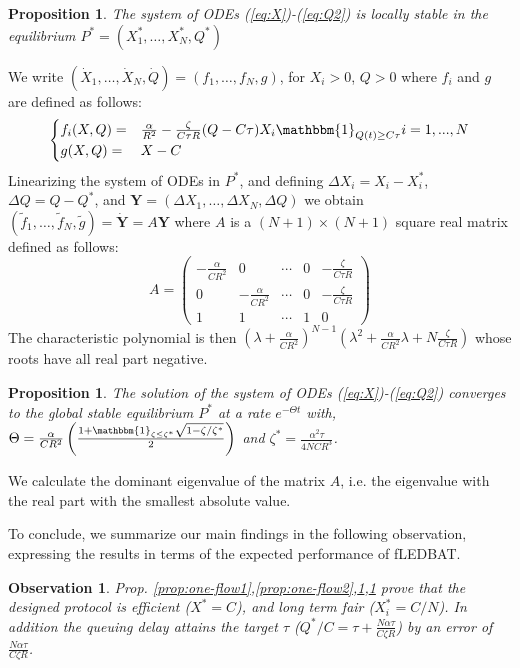 \documentclass[conference]{IEEEtran}
\newtheorem{prop}[theorem]{Proposition}
\newtheorem{obs}[theorem]{Observation}
\newcommand{\I}[1]{{\mathbbm{1}_{#1}}}
\newcommand{\fledbat}[0]{fLEDBAT}
\begin{document}
\begin{prop}\label{prop:one-flow3}
The system of ODEs (\ref{eq:X})-(\ref{eq:Q2}) is locally
stable in the equilibrium $P^*=(X_1^*,\dots, X_N^*,Q^*)$
\end{prop}
\begin{IEEEproof}
We write $(\dot{X}_1,\dots,\dot{X}_N,\dot{Q}) = (f_1,\dots,f_N,g)$, for $X_i>0$, $Q>0$ where $f_i$ and $g$
are defined as follows:
\begin{align}\label{eq:local-stable-XQ}
\begin{cases}
f_i(X,Q) =& \frac{\alpha}{R^2} - \frac{\zeta}{C\tau R}(Q-C\tau)X_i\I{Q(t)\ge C\tau} i=1,...,N\\
g(X,Q) =& X - C
\end{cases}
\end{align}
Linearizing the system of ODEs in $P^{*}$, and defining  $\Delta X_i = X_i-X_i^{*}$, $\Delta Q = Q-Q^{*}$,
and $\mathbf{Y}=(\Delta X_1,\dots,\Delta X_N,\Delta Q)$ we obtain $(\tilde{f}_1,\dots, \tilde{f}_N,\tilde{g})= \dot{\mathbf{Y}}=  A \mathbf{Y}$ where $A$ is a $(N+1)\times (N+1)$ square real matrix defined as follows:
$$A= \left(
\begin{array}{ccccc}
-\frac{\alpha}{C R^2} &  0 & \cdots & 0 & -\frac{\zeta}{C\tau R } \\
	0 	      &  -\frac{\alpha}{C R^2} & \cdots & 0 & -\frac{\zeta}{C\tau R } \\
       1              &  1 & \cdots & 1 & 0
\end{array}
\right)$$
The characteristic polynomial is then
$\left(\lambda + \frac{\alpha}{C R^2}\right)^{N-1}\left(\lambda^2+\frac{\alpha}{C R^2}\lambda +N\frac{\zeta}{C\tau R }\right)$
whose roots have all real part negative.
\end{IEEEproof}
\begin{prop}\label{prop:one-flow4}
The solution of the system of ODEs (\ref{eq:X})-(\ref{eq:Q2}) converges to the
global stable equilibrium $P^*$ at a rate $e^{-\Theta t}$ with,
$\Theta=\frac{\alpha}{CR^2}\left(\frac{1+\I{\zeta\leq \zeta^*}\sqrt{1-\zeta/\zeta^*}}{2}\right)$
and $\zeta^*=\frac{\alpha^2 \tau}{4 N C R^3}$.
\end{prop}
\begin{IEEEproof}
We calculate the dominant eigenvalue of
the matrix $A$, i.e. the eigenvalue with the real part
with the smallest absolute value.
\end{IEEEproof}
\noindent To conclude, we summarize our main findings in the following observation, expressing the results in terms 
of the expected performance of \fledbat.
\begin{obs}
Prop. \ref{prop:one-flow1},\ref{prop:one-flow2},\ref{prop:one-flow3},\ref{prop:one-flow4}
prove that the designed protocol is efficient ($X^*=C$), and long term fair
($X_i^*=C/N$). In addition the queuing delay attains the target $\tau$
($Q^*/C = \tau + \frac{N\alpha\tau }{ C \zeta R}$) by an error of $\frac{N\alpha\tau }{ C \zeta R}$.
\end{obs}
\end{document}
